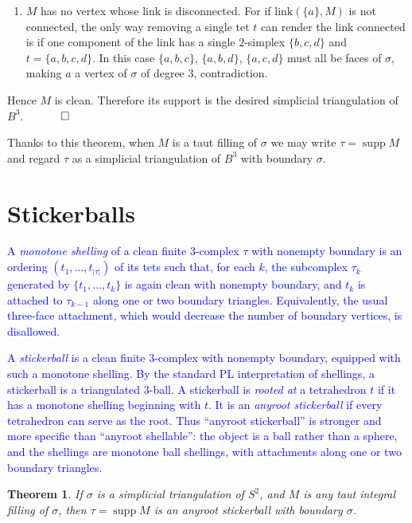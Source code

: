 \documentclass[12pt]{article}
\newtheorem{theorem}{Theorem}
\newcommand{\proofend}{$\quad \qed$}
\newcommand{\kw}{\mathrm}
\newcommand{\link}{\kw{link}}
\begin{document}
{\begin{enumerate}
\item
$M$ has no vertex whose link is disconnected.
For if $\link(\{a\},M)$ is not connected,
the only way removing a single tet $t$
can render the link connected
is if one component of the link has a single $2$-simplex
$\{b,c,d\}$ and $t=\{a,b,c,d\}$.
In this case $\{a,b,c\}$, $\{a,b,d\}$, $\{a,c,d\}$ must
all be faces of $\sigma$,
making $a$ a vertex of $\sigma$ of degree $3$, contradiction.

\end{enumerate}

Hence $M$ is clean. Therefore its support is the desired simplicial
triangulation of $B^3$.
\proofend

Thanks to this theorem, when $M$ is a taut filling of $\sigma$ we may write
$\tau=\operatorname{supp} M$ and regard $\tau$ as a simplicial triangulation
of $B^3$ with boundary $\sigma$.

\section{Stickerballs}

\textcolor{blue}{A \emph{monotone shelling} of a clean finite $3$-complex $\tau$
with nonempty boundary is an ordering
$(t_1,\ldots,t_{|\tau|})$
of its tets such that, for each $k$, the subcomplex $\tau_k$ generated
by $\{t_1,\ldots,t_k\}$ is again clean with nonempty boundary, and
$t_k$ is attached to $\tau_{k-1}$ along one or two boundary triangles.
Equivalently, the usual three-face attachment, which would decrease the
number of boundary vertices, is disallowed.}

\textcolor{blue}{A \emph{stickerball} is a clean finite $3$-complex with nonempty
boundary, equipped with such a monotone shelling.  By the standard PL
interpretation of shellings, a stickerball is a triangulated $3$-ball.
A stickerball is \emph{rooted at} a tetrahedron $t$ if it has a monotone
shelling beginning with $t$.  It is an \emph{anyroot stickerball} if every
tetrahedron can serve as the root.  Thus ``anyroot stickerball'' is stronger
and more specific than ``anyroot shellable'': the object is a ball rather
than a sphere, and the shellings are monotone ball shellings, with
attachments along one or two boundary triangles.}

\begin{theorem} \label{th3}
If $\sigma$ is a simplicial triangulation of $S^2$,
and $M$ is any taut integral filling of $\sigma$,
then $\tau=\operatorname{supp} M$ is an anyroot stickerball with boundary
$\sigma$.
\end{theorem}

}
\end{document}
